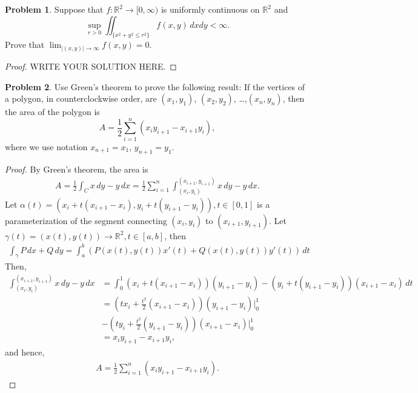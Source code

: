 \documentclass[11pt]{article}
\theoremstyle{definition}
\newtheorem{problem}{Problem}
\theoremstyle{definition}
\begin{document}
\medskip


\begin{problem}
Suppose that $f:\mathbb{R}^2\to [0,\infty)$ is uniformly continuous on $\mathbb{R}^2$ and
$$
\sup_{r>0} \iint_{\{x^2+y^2\leq r^2\}} f(x,y)\, dxdy <\infty.
$$
Prove that $\displaystyle \lim_{|(x,y)|\to\infty} f(x,y)=0$.
\end{problem}
\begin{proof}
	WRITE YOUR SOLUTION HERE.
\end{proof}


\medskip

\begin{problem}
Use Green's theorem to prove the following result:
If the vertices of a polygon, in counterclockwise order, are
$(x_1,y_1)$, $(x_2,y_2)$, \ldots,$(x_n,y_n)$, then the area of the
polygon is
$$
A=\frac{1}{2}
\sum_{i=1}^n(x_iy_{i+1}-x_{i+1}y_i),
$$
where we use notation $x_{n+1}=x_1$, $y_{n+1}=y_1$.
\end{problem}
\begin{proof}
By Green's theorem, the area is
\begin{align*}
    A = \frac{1}{2} \int_C x\, dy - y\, dx = \frac{1}{2} \sum^n_{i=1} \int^{(x_{i+1}, y_{i+1})}_{(x_{i}, y_{i})} x\, dy - y\, dx.
\end{align*}
Let $\alpha(t) = \left(x_i + t(x_{i+1} - x_{i}), y_i + t(y_{i+1} - y_{i}) \right), t\in [0,1]$ is a parameterization of the segment connecting $(x_{i}, y_{i})$ to $(x_{i+1}, y_{i+1})$. Let $\gamma(t) = (x(t), y(t)) \to \mathbb{R}^2, t \in [a,b]$, then 
\begin{align*}
    \int_\gamma P\, dx + Q\, dy = \int^b_a \left(P(x(t),y(t))x'(t) + Q(x(t),y(t))y'(t) \right)\, dt
\end{align*}
Then,
\begin{align*}
    \int^{(x_{i+1}, y_{i+1})}_{(x_{i}, y_{i})} x\, dy - y\, dx & = \int^1_0 (x_i + t(x_{i+1} - x_{i}))(y_{i+1} - y_i) - (y_i + t(y_{i+1} - y_{i}))(x_{i+1} - x_i)\, dt \\
    & = \left(tx_i + \frac{t^2}{2}(x_{i+1} - x_i)\right) (y_{i+1} - y_i)\Bigg|^1_0 \\
    & - \left(ty_i + \frac{t^2}{2} (y_{i+1} - y_i)\right) (x_{i+1} - x_i)\Bigg|^1_0 \\
    & = x_i y_{i+1} - x_{i+1} y_i,
\end{align*}
and hence,
\begin{align*}
    A = \frac{1}{2} \sum_{i=1}^n (x_i y_{i+1} - x_{i+1} y_i).
\end{align*}
\end{proof}
\end{document}

